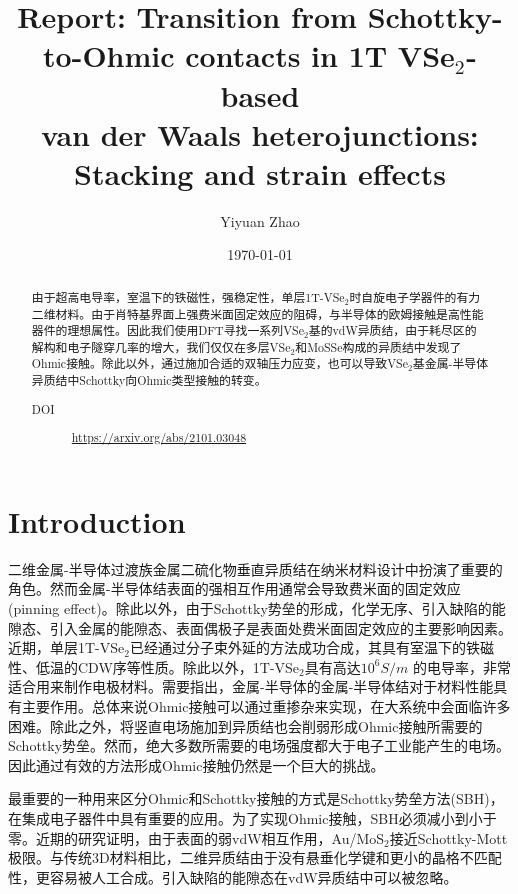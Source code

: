 \documentclass[reprint, aps, prb, showkeys]{revtex4-2}
\begin{document}
\title{Report: Transition from Schottky-to-Ohmic contacts in 1T VSe$_2$-based\\
 van der Waals heterojunctions: Stacking and strain effects}

\author{Yiyuan Zhao}
\date{\today}

\begin{abstract}
由于超高电导率，室温下的铁磁性，强稳定性，单层1T-VSe$_2$时自旋电子学器件的有力二维材料。由于肖特基界面上强费米面固定效应的阻碍，与半导体的欧姆接触是高性能器件的理想属性。因此我们使用DFT寻找一系列VSe$_2$基的vdW异质结，由于耗尽区的解构和电子隧穿几率的增大，我们仅仅在多层VSe$_2$和MoSSe构成的异质结中发现了Ohmic接触。除此以外，通过施加合适的双轴压力应变，也可以导致VSe$_2$基金属-半导体异质结中Schottky向Ohmic类型接触的转变。
\begin{description}
    \item[DOI] \url{https://arxiv.org/abs/2101.03048}
\end{description}
\end{abstract}


\maketitle

\section{Introduction}
二维金属-半导体过渡族金属二硫化物垂直异质结在纳米材料设计中扮演了重要的角色。然而金属-半导体结表面的强相互作用通常会导致费米面的固定效应(pinning effect)。除此以外，由于Schottky势垒的形成，化学无序、引入缺陷的能隙态、引入金属的能隙态、表面偶极子是表面处费米面固定效应的主要影响因素。近期，单层1T-VSe$_2$已经通过分子束外延的方法成功合成，其具有室温下的铁磁性、低温的CDW序等性质。除此以外，1T-VSe$_2$具有高达$10^6 S/m$ 的电导率，非常适合用来制作电极材料。需要指出，金属-半导体的金属-半导体结对于材料性能具有主要作用。总体来说Ohmic接触可以通过重掺杂来实现，在大系统中会面临许多困难。除此之外，将竖直电场施加到异质结也会削弱形成Ohmic接触所需要的Schottky势垒。然而，绝大多数所需要的电场强度都大于电子工业能产生的电场。因此通过有效的方法形成Ohmic接触仍然是一个巨大的挑战。

最重要的一种用来区分Ohmic和Schottky接触的方式是Schottky势垒方法(SBH)，在集成电子器件中具有重要的应用。为了实现Ohmic接触，SBH必须减小到小于零。近期的研究证明，由于表面的弱vdW相互作用，Au/MoS$_2$接近Schottky-Mott极限。与传统3D材料相比，二维异质结由于没有悬垂化学键和更小的晶格不匹配性，更容易被人工合成。引入缺陷的能隙态在vdW异质结中可以被忽略。
\end{document}
